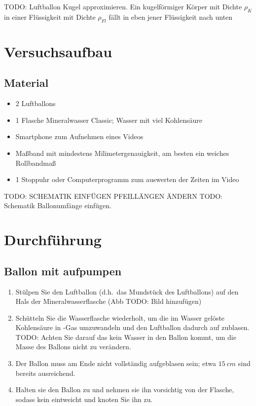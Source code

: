 \documentclass{article}
\begin{document}
    TODO: Luftballon Kugel approximieren. Ein kugelförmiger Körper mit Dichte \(\rho_K\) in einer Flüssigkeit mit Dichte \(\rho_{Fl}\) fällt in eben jener Flüssigkeit nach unten

    \section{Versuchsaufbau}
        \subsection{Material}
        \begin{itemize}
            \item 2 Luftballons
            \item 1 Flasche Mineralwasser Classic; Wasser mit viel Kohlensäure
            \item Smartphone zum Aufnehmen eines Videos
            \item Maßband mit mindestens Milimetergenauigkeit, am besten ein weiches Rollbandmaß
            \item 1 Stoppuhr oder Computerprogramm zum auswerten der Zeiten im Video
        \end{itemize}

    TODO: SCHEMATIK EINFÜGEN PFEILLÄNGEN ÄNDERN
    TODO: Schematik Ballonumfänge einfügen.

    \section{Durchführung}
        \subsection{Ballon mit \texorpdfstring{}{CO2} aufpumpen}
            \begin{enumerate}
                \item Stülpen Sie den Luftballon (d.h.\ das Mundstück des Luftballons) auf den Hals der Mineralwasserflasche (Abb TODO: Bild hinzufügen)
                \item Schütteln Sie die Wasserflasche wiederholt, um die im Wasser gelöste Kohlensäure in -Gas umzuwandeln und den Luftballon dadurch auf zublasen.
                TODO: Achten Sie darauf das kein Wasser in den Ballon kommt, um die Masse des Ballons nicht zu verändern.
                \item Der Ballon muss am Ende nicht vollständig aufgeblasen sein; etwa \(\SI{15}{cm}\) sind bereits ausreichend.
                \item Halten sie den Ballon zu und nehmen sie ihn vorsichtig von der Flasche, sodass kein  eintweicht und knoten Sie ihn zu.
            \end{enumerate}
        
\end{document}
